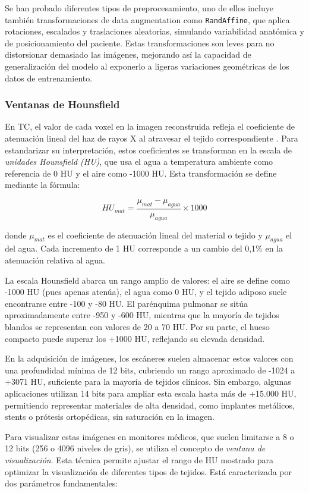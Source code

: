Se han probado diferentes tipos de preprocesamiento, uno de ellos incluye también transformaciones de data augmentation como \texttt{RandAffine}, que aplica rotaciones, escalados y traslaciones aleatorias, simulando variabilidad anatómica y de posicionamiento del paciente. Estas transformaciones son leves para no distorsionar demasiado las imágenes, mejorando así la capacidad de generalización del modelo al exponerlo a ligeras variaciones geométricas de los datos de entrenamiento.

\subsubsection{Ventanas de Hounsfield}

En TC, el valor de cada voxel en la imagen reconstruida refleja el coeficiente de atenuación lineal del haz de rayos X al atravesar el tejido correspondiente \parencite{calzado2010tomografia}. Para estandarizar su interpretación, estos coeficientes se transforman en la escala de \textit{unidades Hounsfield (HU)}, que usa el agua a temperatura ambiente como referencia de 0 HU y el aire como -1000 HU. Esta transformación se define mediante la fórmula:

\[
HU_{mat} = \frac{\mu_{mat} - \mu_{agua}}{\mu_{agua}} \times 1000
\]

donde $\mu_{mat}$ es el coeficiente de atenuación lineal del material o tejido y $\mu_{agua}$ el del agua. Cada incremento de 1 HU corresponde a un cambio del 0,1\% en la atenuación relativa al agua.  

La escala Hounsfield abarca un rango amplio de valores: el aire se define como -1000 HU (pues apenas atenúa), el agua como 0 HU, y el tejido adiposo suele encontrarse entre -100 y -80 HU. El parénquima pulmonar se sitúa aproximadamente entre -950 y -600 HU, mientras que la mayoría de tejidos blandos se representan con valores de 20 a 70 HU. Por su parte, el hueso compacto puede superar los +1000 HU, reflejando su elevada densidad.

En la adquisición de imágenes, los escáneres suelen almacenar estos valores con una profundidad mínima de 12 bits, cubriendo un rango aproximado de -1024 a +3071 HU, suficiente para la mayoría de tejidos clínicos. Sin embargo, algunas aplicaciones utilizan 14 bits para ampliar esta escala hasta más de +15.000 HU, permitiendo representar materiales de alta densidad, como implantes metálicos, stents o prótesis ortopédicas, sin saturación en la imagen.

Para visualizar estas imágenes en monitores médicos, que suelen limitarse a 8 o 12 bits (256 o 4096 niveles de gris), se utiliza el concepto de \textit{ventana de visualización}. Esta técnica permite ajustar el rango de HU mostrado para optimizar la visualización de diferentes tipos de tejidos. Está caracterizada por dos parámetros fundamentales:

